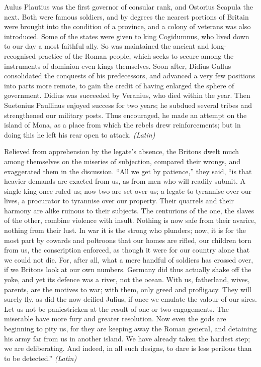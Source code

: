 
Aulus Plautius was the first governor of consular rank, and Ostorius Scapula the next. Both were famous soldiers, and by degrees the nearest portions of Britain were brought into the condition of a province, and a colony of veterans was also introduced. Some of the states were given to king Cogidumnus, who lived down to our day a most faithful ally. So was maintained the ancient and long-recognised practice of the Roman people, which seeks to secure among the instruments of dominion even kings themselves. Soon after, Didius Gallus consolidated the conquests of his predecessors, and advanced a very few positions into parts more remote, to gain the credit of having enlarged the sphere of government. Didius was succeeded by Veranius, who died within the year. Then Suetonius Paullinus enjoyed success for two years; he subdued several tribes and strengthened our military posts. Thus encouraged, he made an attempt on the island of Mona, as a place from which the rebels drew reinforcements; but in doing this he left his rear open to attack. \emph{(Latin)}


Relieved from apprehension by the legate's absence, the Britons dwelt much among themselves on the miseries of subjection, compared their wrongs, and exaggerated them in the discussion. ``All we get by patience,'' they said, ``is that heavier demands are exacted from us, as from men who will readily submit. A single king once ruled us; now two are set over us; a legate to tyrannise over our lives, a procurator to tyrannise over our property. Their quarrels and their harmony are alike ruinous to their subjects. The centurions of the one, the slaves of the other, combine violence with insult. Nothing is now safe from their avarice, nothing from their lust. In war it is the strong who plunders; now, it is for the most part by cowards and poltroons that our homes are rifled, our children torn from us, the conscription enforced, as though it were for our country alone that we could not die. For, after all, what a mere handful of soldiers has crossed over, if we Britons look at our own numbers. Germany did thus actually shake off the yoke, and yet its defence was a river, not the ocean. With us, fatherland, wives, parents, are the motives to war; with them, only greed and profligacy. They will surely fly, as did the now deified Julius, if once we emulate the valour of our sires. Let us not be panicstricken at the result of one or two engagements. The miserable have more fury and greater resolution. Now even the gods are beginning to pity us, for they are keeping away the Roman general, and detaining his army far from us in another island. We have already taken the hardest step; we are deliberating. And indeed, in all such designs, to dare is less perilous than to be detected.'' \emph{(Latin)}

